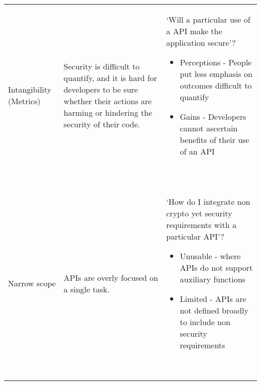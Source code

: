 \documentclass[conference]{IEEEtran}
\begin{document}
\begin{table*}
\begin{tabular}{p{} p{} p{}}
    Intangibility (Metrics) & Security is difficult to quantify, and it is hard for developers to be sure whether their actions are harming or hindering the security of their code. & `Will a particular use of a API make the application secure'?\begin{itemize} \item Perceptions - People put less emphasis on outcomes difficult to quantify \item Gains - Developers cannot ascertain benefits of their use of an API \end{itemize} ~\cite{acarusability2017,ranenberg2020,tahaei2019,oliveira2014,hilton2017,anderson2013,acquisitilikes2021}\\ 
    \addlinespace

    Narrow scope & APIs are overly focused on a single task.  & `How do I integrate non crypto yet security requirements with a particular API'? \begin{itemize} \item Unusable - where APIs do not support auxiliary functions \item Limited - APIs are not defined broadly to include non security requirements \end{itemize}
                                                                                 ~\cite{smithgreen2016,erikacar2017,christakis2016,oorschootenemy2008}\\
    \bottomrule
  \end{tabular}
\end{table*}
\end{document}
